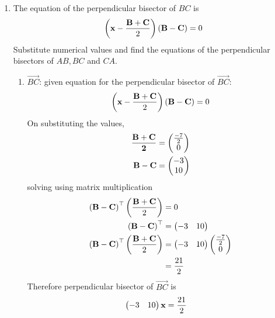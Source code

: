 \documentclass[11pt]{book}
\begin{document}
\begin{enumerate}[label=\thesection.\arabic*.,ref=\thesection.\theenumi]

\item The equation of the perpendicular bisector of $BC$ is
\begin{align}
\label{eq:tri-perp-bisect}
\brak{\vec{x}-\frac{\vec{B}+\vec{C}}{2}}\brak{\vec{B}-\vec{C}} = 0
\end{align}
Substitute numerical values and find the equations of the perpendicular bisectors of $AB, BC$ and $CA$.
\\	\solution
\begin{enumerate}
    \item $\vec{BC}$: given equation for the perpendicular bisector of $\vec{BC}$:
\begin{align}
    \left(\mathbf{x}-\frac{\mathbf{B}+\mathbf{C}}{2}\right)\left(\mathbf{B}-\mathbf{C}\right) = 0
\end{align}
On substituting the values,
\begin{align}
    \mathbf{\frac{\mathbf{B}+\mathbf{C}}{2}} &= \begin{pmatrix}\frac{-7}{2} \\ 0\end{pmatrix} \\
\mathbf{B}-\mathbf{C} &= \begin{pmatrix}-3 \\ 10\end{pmatrix} \\
\end{align}
solving using matrix multiplication
\begin{align}
\left(\mathbf{B}-\mathbf{C}\right)^{\top}\left(\frac{\mathbf{B}+\mathbf{C}}{2}\right)&=0 \\
\left(\mathbf{B}-\mathbf{C}\right)^{\top} &= \begin{pmatrix}-3 & 10\end{pmatrix} \\
\left(\mathbf{B}-\mathbf{C}\right)^{\top}\left(\frac{\mathbf{B}+\mathbf{C}}{2}\right)&=\begin{pmatrix}-3 & 10\end{pmatrix}\begin{pmatrix}\frac{-7}{2} \\ 0\end{pmatrix}\\
&= \frac{21}{2}
\end{align}
Therefore perpendicular bisector of $\vec{BC}$ is
\begin{align}
    \begin{pmatrix}-3 & 10\end{pmatrix}\mathbf{x}&= \frac{21}{2}
\end{align}


\end{enumerate}
\end{enumerate}
\end{document}
